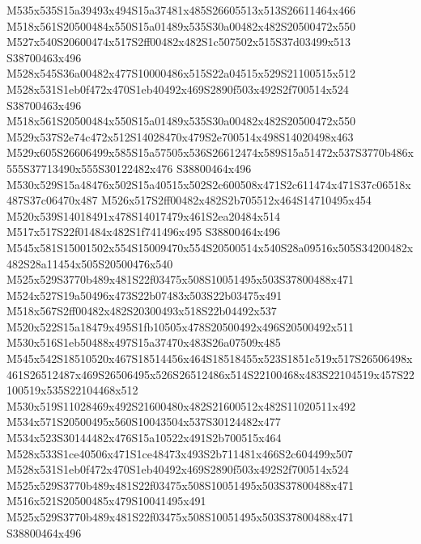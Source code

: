 \documentclass{article}
\begin{document}
\begin{multicols}{2}






M535x535S15a39493x494S15a37481x485S26605513x513S26611464x466 M518x561S20500484x550S15a01489x535S30a00482x482S20500472x550 M527x540S20600474x517S2ff00482x482S1c507502x515S37d03499x513 S38700463x496 M528x545S36a00482x477S10000486x515S22a04515x529S21100515x512 M528x531S1eb0f472x470S1eb40492x469S2890f503x492S2f700514x524 S38700463x496 M518x561S20500484x550S15a01489x535S30a00482x482S20500472x550 M529x537S2e74c472x512S14028470x479S2e700514x498S14020498x463 M529x605S26606499x585S15a57505x536S26612474x589S15a51472x537S3770b486x555S37713490x555S30122482x476 S38800464x496 M530x529S15a48476x502S15a40515x502S2c600508x471S2c611474x471S37c06518x487S37c06470x487 M526x517S2ff00482x482S2b705512x464S14710495x454 M520x539S14018491x478S14017479x461S2ea20484x514 M517x517S22f01484x482S1f741496x495 S38800464x496 M545x581S15001502x554S15009470x554S20500514x540S28a09516x505S34200482x482S28a11454x505S20500476x540 M525x529S3770b489x481S22f03475x508S10051495x503S37800488x471 M524x527S19a50496x473S22b07483x503S22b03475x491 M518x567S2ff00482x482S20300493x518S22b04492x537 M520x522S15a18479x495S1fb10505x478S20500492x496S20500492x511 M530x516S1eb50488x497S15a37470x483S26a07509x485 M545x542S18510520x467S18514456x464S18518455x523S1851c519x517S26506498x461S26512487x469S26506495x526S26512486x514S22100468x483S22104519x457S22100519x535S22104468x512 M530x519S11028469x492S21600480x482S21600512x482S11020511x492 M534x571S20500495x560S10043504x537S30124482x477 M534x523S30144482x476S15a10522x491S2b700515x464 M528x533S1ce40506x471S1ce48473x493S2b711481x466S2c604499x507 M528x531S1eb0f472x470S1eb40492x469S2890f503x492S2f700514x524 M525x529S3770b489x481S22f03475x508S10051495x503S37800488x471 M516x521S20500485x479S10041495x491 M525x529S3770b489x481S22f03475x508S10051495x503S37800488x471 S38800464x496


\end{multicols}
\end{document}
